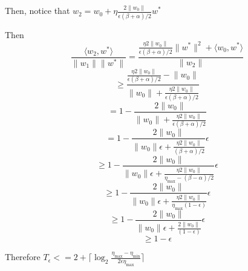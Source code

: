\documentclass{article}
\begin{document}
Then,
notice that $w_2 = w_0 +\eta \frac{2  \lVert w_0 \rVert}{\epsilon (\beta + \alpha)/2} w^*$

Then 
$$
\frac{\langle w_2, w^* \rangle}{\lVert w_1 \rVert \lVert w^* \rVert} = \frac{
\frac{\eta 2  \lVert w_0 \rVert}{\epsilon (\beta + \alpha)/2} \lVert w^* \lVert ^2 + \langle w_0, w^* \rangle}{\lVert w_2 \rVert}
$$ 
$$
\geq \frac{\frac{\eta 2  \lVert w_0 \rVert}{\epsilon (\beta + \alpha)/2} - \lVert w_0 \rVert}{\lVert w_0 \rVert +\frac{\eta 2  \lVert w_0 \rVert}{\epsilon (\beta + \alpha)/2} }
$$
$$
= 1 - \frac{2 \lVert w_0  \rVert}{\lVert w_0 \rVert +\frac{\eta 2  \lVert w_0 \rVert}{\epsilon (\beta + \alpha)/2} }
$$
$$
= 1 - \frac{2\lVert w_0 \rVert}{\lVert w_0  \rVert \epsilon + \frac{\eta 2  \lVert w_0 \rVert}{(\beta + \alpha)/2} } \epsilon
$$
$$
\geq  1 - \frac{2\lVert w_0 \rVert}{\lVert w_0  \rVert \epsilon + \frac{\eta 2  \lVert w_0 \rVert}{\eta_{\max} - (\beta - \alpha) / 2} } \epsilon
$$
$$
\geq  1 - \frac{2\lVert w_0 \rVert}{\lVert w_0  \rVert \epsilon + \frac{\eta 2  \lVert w_0 \rVert}{\eta_{\max} (1-\epsilon)} } \epsilon
$$
$$
\geq 1 - \frac{2\lVert w_0 \rVert}{\lVert w_0  \rVert \epsilon + \frac{ 2  \lVert w_0 \rVert}{(1-\epsilon)} } \epsilon
$$
$$
\geq 1 - \epsilon
$$

Therefore 
$T_\epsilon <=  2 + \lceil \log_2 \frac{\eta_{\max} - \eta_{\min}}{2\epsilon\eta_{\max}}  \rceil$
\end{document}
